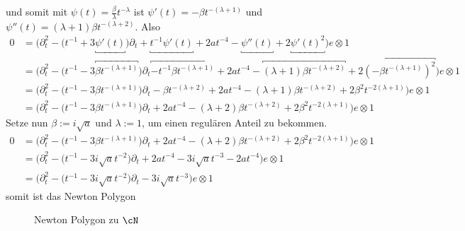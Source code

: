\begin{try}
und somit mit $\psi(t)=\frac{\beta}{\lambda}t^{-\lambda}$ ist 
$\psi'(t)=-\beta t^{-(\lambda+1)}$ und
$\psi''(t)=(\lambda+1)\beta t^{-(\lambda+2)}$. Also
\begin{align*}
0 &= \Big(\partial_t^2 - \big(t^{-1} + 3\underbracket{\psi'(t)}\big)\partial_t
   + \underbracket{t^{-1} \psi'(t)} + 2at^{-4} -\underbracket{\psi''(t)}
   + 2 \underbracket{\psi'(t)^2}\Big) e\otimes 1
\\&= \Big(\partial_t^2 - \big(t^{-1} 
   - 3\overbracket{\beta t^{-(\lambda+1)}}\big)\partial_t
   \overbracket{- t^{-1} \beta t^{-(\lambda+1)}} + 2at^{-4} 
   - \overbracket{(\lambda+1)\beta t^{-(\lambda+2)}}
   + 2 \overbracket{(-\beta t^{-(\lambda+1)})^2}\Big) e\otimes 1
\\&= \Big(\partial_t^2 - \big(t^{-1} - 3\beta t^{-(\lambda+1)}\big)\partial_t
   - \beta t^{-(\lambda+2)} + 2at^{-4} - (\lambda+1)\beta t^{-(\lambda+2)}
   + 2 \beta^2 t^{-2(\lambda+1)}\Big) e\otimes 1
\\&= \Big(\partial_t^2 - \big(t^{-1} - 3\beta t^{-(\lambda+1)}\big)\partial_t
   + 2at^{-4} - (\lambda+2)\beta t^{-(\lambda+2)}
   + 2 \beta^2 t^{-2(\lambda+1)}\Big) e\otimes 1
\end{align*}
Setze nun $\beta:=i\sqrt{a}$ und $\lambda:=1$, um einen regulären Anteil zu
bekommen.
\begin{align*}
0 &= \Big(\partial_t^2 - \big(t^{-1} - 3\beta t^{-(\lambda+1)}\big)\partial_t
   + 2at^{-4} - (\lambda+2)\beta t^{-(\lambda+2)}
   + 2 \beta^2 t^{-2(\lambda+1)}\Big) e\otimes 1
\\&= \Big(\partial_t^2 - \big(t^{-1} - 3i\sqrt{a}
    t^{-2}\big)\partial_t
   + 2at^{-4} - 3i\sqrt{a} t^{-3}
   - 2a t^{-4}\Big) e\otimes 1
\\&= \Big(\partial_t^2 - \big(t^{-1} - 3i\sqrt{a} t^{-2}\big)\partial_t
   - 3i\sqrt{a} t^{-3} \Big) e\otimes 1
\end{align*}
somit ist das Newton Polygon
\begin{figure}[H]
\caption{Newton Polygon zu $\cN$}
\begin{center}
\end{center}
\end{figure}
\end{try}


